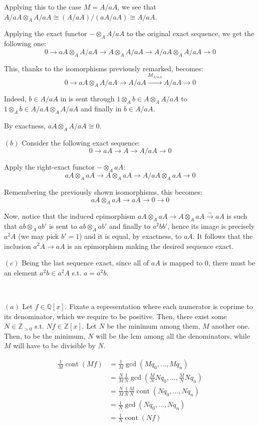 \documentclass{article}
\newcommand{\numberset}{\mathbb}
\newcommand{\Z}{\numberset{Z}}
\newcommand{\Q}{\numberset{Q}}
\newcommand{\exercise}[1]{\noindent {\bf Exercise #1}}
\DeclareMathOperator{\cont}{cont}
\begin{document}
Applying this to the case $M=A/aA$, we see that $A/aA\otimes_A A/aA\cong (A/aA)/(aA/aA)\cong A/aA$.

Applying the exact functor $-\otimes_A A/aA$ to the original exact sequence, we get the following one:
$$0\rightarrow aA\otimes_A A/aA\rightarrow A\otimes_A A/aA\rightarrow A/aA\otimes_A A/aA\rightarrow 0$$

This, thanks to the isomorphisms previously remarked, becomes:
$$0\rightarrow aA\otimes_A A/aA\rightarrow A/aA\xrightarrow{Id_{A/aA}} A/aA\rightarrow 0$$

Indeed, $b\in A/aA$ in is sent through $1\otimes_A b\in A\otimes_A A/aA$ to $1\otimes_A b\in A/aA\otimes_A A/aA$ and finally in $b\in A/aA$.

By exactness, $aA\otimes_A A/aA\cong 0$.

$(b)$ Consider the following exact sequence:
$$0\rightarrow aA\rightarrow A\rightarrow A/aA\rightarrow 0$$

Apply the right-exact functor $-\otimes_A aA$:
$$aA\otimes_A aA\rightarrow A\otimes_A aA\rightarrow A/aA\otimes_A aA\rightarrow 0$$

Remembering the previously shown isomorphisms, this becomes:
$$aA\otimes_A aA\rightarrow aA\rightarrow 0\rightarrow 0$$

Now, notice that the induced epimorphism $aA\otimes_A aA\rightarrow A\otimes_A aA\xrightarrow{\sim} aA$ is such that $ab\otimes_A ab'$ is sent to $ab\otimes_A ab'$ and finally to $a^2bb'$, hence its image is precisely $a^2A$ (we may pick $b'=1$) and it is equal, by exactness, to $aA$. It follows that the inclusion $a^2A\rightarrow aA$ is an epimorphism making the desired sequence exact.

$(c)$ Being the last sequence exact, since all of $aA$ is mapped to 0, there must be an element $a^2b\in a^2A$ s.t. $a=a^2b$.


~\\
\exercise{3}

$(a)$ Let $f\in\Q[x]$. Fixate a representation where each numerator is coprime to its denominator, which we require to be positive. Then, there exist some $N\in\Z_{>0}$ s.t. $Nf\in\Z[x]$. Let $N$ be the minimum among them, $M$ another one. Then, to be the minimum, $N$ will be the lcm among all the denominators, while $M$ will have to be divisible by $N$.

\begin{align*}
		\frac{1}{M}\cont(Mf) & =\frac{1}{M}\gcd(Mq_0,\ldots,Mq_n) \\
		& =\frac{N}{M}\frac{1}{N}\gcd(\frac{M}{N}Nq_0,\ldots,\frac{M}{N}Nq_n) \\
		& =\frac{N}{M}\frac{1}{N}\frac{M}{N}\cont(Nq_0,\ldots,Nq_n) \\
		& =\frac{1}{N}\gcd(Nq_0,\ldots,Nq_n) \\
		& =\frac{1}{N}\cont(Nf)
\end{align*}
\end{document}
